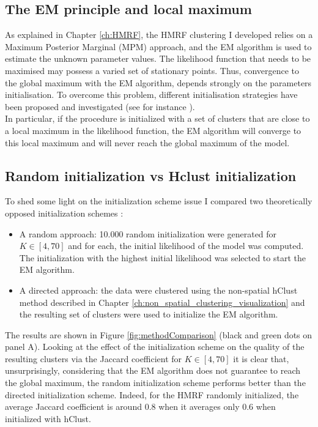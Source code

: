 	\subsection{The EM principle and local maximum}
As explained in Chapter \ref{ch:HMRF}, the HMRF clustering I developed relies on a Maximum Posterior Marginal (MPM) approach, and the EM algorithm is used to estimate the unknown parameter values. The likelihood function that needs to be maximised may possess a varied set of stationary points. Thus, convergence to the global maximum with the EM algorithm, depends strongly on the parameters initialisation. To overcome this problem, different initialisation strategies have been proposed and investigated (see for instance \cite{biernacki03,karlis03,mclachlan04}).\\

In particular, if the procedure is initialized with a set of clusters that are close to a local maximum in the likelihood function, the EM algorithm will converge to this local maximum and will never reach the global maximum of the model.

	\subsection{Random initialization vs Hclust initialization}
	To shed some light on the initialization scheme issue I compared two theoretically opposed initialization schemes :
\begin{itemize}
	\item A random approach: 10.000 random initialization were generated for $K \in [4,70]$ and for each, the initial likelihood of the model was computed. The initialization with the highest initial likelihood was selected to start the EM algorithm.
	\item A directed approach: the data were clustered using the non-spatial hClust method described in Chapter \ref{ch:non_spatial_clustering_visualization} and the resulting set of clusters were used to initialize the EM algorithm.
\end{itemize}

The results are shown in Figure \ref{fig:methodComparison} (black and green dots on panel A). Looking at the effect of the initialization scheme on the quality of the resulting clusters via the Jaccard coefficient for $K \in [4,70]$ it is clear that, unsurprisingly, considering that the EM algorithm does not guarantee to reach the global maximum, the random initialization scheme performs better than the directed initialization scheme. Indeed, for the HMRF randomly initialized, the average Jaccard coefficient is around $0.8$ when it averages only $0.6$ when initialized with hClust.\\

